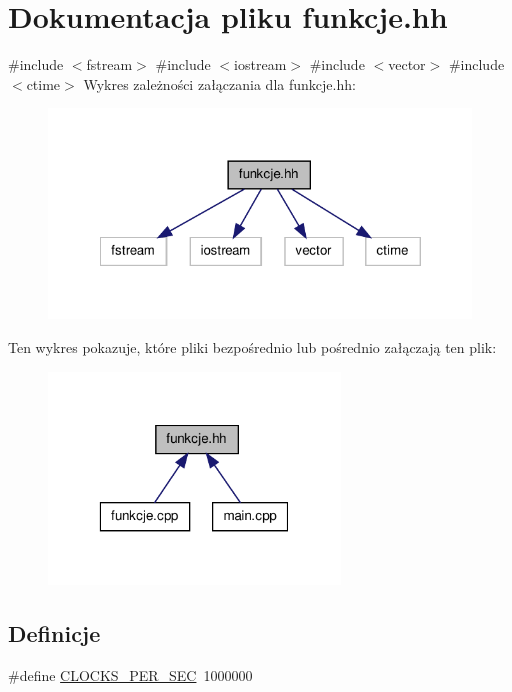 \hypertarget{funkcje_8hh}{\section{\-Dokumentacja pliku funkcje.\-hh}
\label{funkcje_8hh}
}
{\ttfamily \#include $<$fstream$>$}\*
{\ttfamily \#include $<$iostream$>$}\*
{\ttfamily \#include $<$vector$>$}\*
{\ttfamily \#include $<$ctime$>$}\*
\-Wykres zależności załączania dla funkcje.\-hh\-:\nopagebreak
\begin{figure}[H]
\begin{center}
\leavevmode
\includegraphics[width=322pt]{funkcje_8hh__incl}
\end{center}
\end{figure}
\-Ten wykres pokazuje, które pliki bezpośrednio lub pośrednio załączają ten plik\-:\nopagebreak
\begin{figure}[H]
\begin{center}
\leavevmode
\includegraphics[width=220pt]{funkcje_8hh__dep__incl}
\end{center}
\end{figure}
\subsection*{\-Definicje}
\begin{DoxyCompactItemize}
\item 
\#define \hyperlink{funkcje_8hh_a3d9fc3c745d0880902fe3ea3d5d5f71e}{\-C\-L\-O\-C\-K\-S\-\_\-\-P\-E\-R\-\_\-\-S\-E\-C}~1000000
\end{DoxyCompactItemize}
